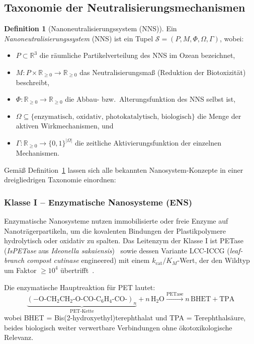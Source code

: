 ﻿\documentclass[12pt,a4paper]{article}
\theoremstyle{definition}
\newtheorem{definition}{Definition}[section]
\theoremstyle{remark}
\newcommand{\R}{\mathbb{R}}
\begin{document}
\subsection{Taxonomie der Neutralisierungsmechanismen}

\begin{definition}[Nanoneutralisierungssystem (NNS)]
\label{def:nns}
Ein \emph{Nanoneutralisierungssystem} (NNS) ist ein Tupel
$\mathcal{S} = (P, M, \Phi, \Omega, \Gamma)$, wobei:
\begin{itemize}
  \item $P \subset \R^3$ die räumliche Partikelverteilung des NNS im Ozean bezeichnet,
  \item $M: P \times \R_{\geq 0} \to \R_{\geq 0}$ das Neutralisierungsmaß
        (Reduktion der Biotoxizität) beschreibt,
  \item $\Phi: \R_{\geq 0} \to \R_{\geq 0}$ die Abbau- bzw.\ Alterungsfunktion
        des NNS selbst ist,
  \item $\Omega \subseteq \{\text{enzymatisch, oxidativ, photokatalytisch, biologisch}\}$
        die Menge der aktiven Wirkmechanismen, und
  \item $\Gamma: \R_{\geq 0} \to \{0,1\}^{|\Omega|}$ die zeitliche Aktivierungsfunktion
        der einzelnen Mechanismen.
\end{itemize}
\end{definition}

Gemäß Definition~\ref{def:nns} lassen sich alle bekannten Nanosystem-Konzepte
in einer dreigliedrigen Taxonomie einordnen:

\subsubsection{Klasse I -- Enzymatische Nanosysteme (ENS)}

Enzymatische Nanosysteme nutzen immobilisierte oder freie Enzyme auf
Nanoträgerpartikeln, um die kovalenten Bindungen der Plastikpolymere hydrolytisch
oder oxidativ zu spalten. Das Leitenzym der Klasse I ist PETase
(\textit{IsPETase} aus \textit{Ideonella sakaiensis})~\cite{yoshida2016bacterium}
sowie dessen Variante LCC-ICCG (\textit{leaf-branch compost cutinase} engineered)
mit einem $k_{\text{cat}}/K_M$-Wert, der den Wildtyp um Faktor $\geq 10^4$
übertrifft~\cite{tournier2020engineered}.

Die enzymatische Hauptreaktion für PET lautet:
\begin{equation}
  \underbrace{(-\text{O-CH}_2\text{CH}_2\text{-O-CO-C}_6\text{H}_4\text{-CO-})_n}_{\text{PET-Kette}}
  + n\,\text{H}_2\text{O}
  \xrightarrow{\text{PETase}}
  n\,\text{BHET} + \text{TPA}
  \label{eq:petase_reaction}
\end{equation}
wobei BHET = Bis(2-hydroxyethyl)terephthalat und TPA = Terephthalsäure, beides
biologisch weiter verwertbare Verbindungen ohne ökotoxikologische Relevanz.
\end{document}
